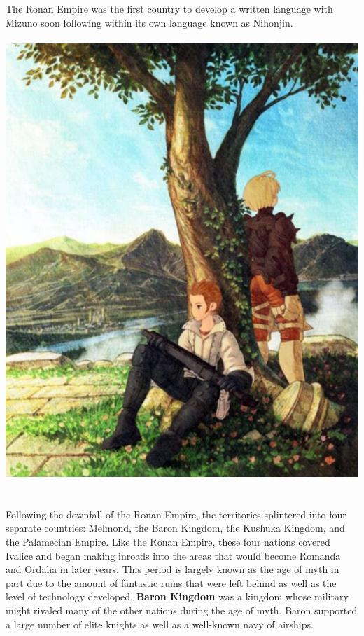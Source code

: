 The Ronan Empire was the first country to develop a written language with Mizuno soon following within its own language known as Nihonjin.
%
\\\\
\includegraphics[width=\columnwidth]{./art/images/tree.jpg}
\\\\
%
\\
Following the downfall of the Ronan Empire, the territories splintered into four separate countries: Melmond, the Baron Kingdom, the Kushuka Kingdom, and the Palamecian Empire. 
Like the Ronan Empire, these four nations covered Ivalice and began making inroads into the areas that would become Romanda and Ordalia in later years. 
This period is largely known as the age of myth in part due to the amount of fantastic ruins that were left behind as well as the level of technology developed.
\textbf{Baron Kingdom} was a kingdom whose military might rivaled many of the other nations during the age of myth. 
Baron supported a large number of elite knights as well as a well-known navy of airships. 
